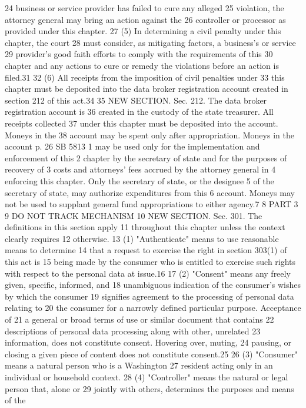 24 business or service provider has failed to cure any alleged
25 violation, the attorney general may bring an action against the
26 controller or processor as provided under this chapter.
27 (5) In determining a civil penalty under this chapter, the court
28 must consider, as mitigating factors, a business's or service
29 provider's good faith efforts to comply with the requirements of this
30 chapter and any actions to cure or remedy the violations before an
action is filed.31
32 (6) All receipts from the imposition of civil penalties under
33 this chapter must be deposited into the data broker registration
account created in section 212 of this act.34
35 NEW SECTION. Sec. 212. The data broker registration account is
36 created in the custody of the state treasurer. All receipts collected
37 under this chapter must be deposited into the account. Moneys in the
38 account may be spent only after appropriation. Moneys in the account
p. 26 SB 5813
1 may be used only for the implementation and enforcement of this
2 chapter by the secretary of state and for the purposes of recovery of
3 costs and attorneys' fees accrued by the attorney general in
4 enforcing this chapter. Only the secretary of state, or the designee
5 of the secretary of state, may authorize expenditures from this
6 account. Moneys may not be used to supplant general fund
appropriations to either agency.7
8 PART 3
9 DO NOT TRACK MECHANISM
10 NEW SECTION. Sec. 301. The definitions in this section apply
11 throughout this chapter unless the context clearly requires
12 otherwise.
13 (1) "Authenticate" means to use reasonable means to determine
14 that a request to exercise the right in section 303(1) of this act is
15 being made by the consumer who is entitled to exercise such rights
with respect to the personal data at issue.16
17 (2) "Consent" means any freely given, specific, informed, and
18 unambiguous indication of the consumer's wishes by which the consumer
19 signifies agreement to the processing of personal data relating to
20 the consumer for a narrowly defined particular purpose. Acceptance of
21 a general or broad terms of use or similar document that contains
22 descriptions of personal data processing along with other, unrelated
23 information, does not constitute consent. Hovering over, muting,
24 pausing, or closing a given piece of content does not constitute
consent.25
26 (3) "Consumer" means a natural person who is a Washington
27 resident acting only in an individual or household context.
28 (4) "Controller" means the natural or legal person that, alone or
29 jointly with others, determines the purposes and means of the
